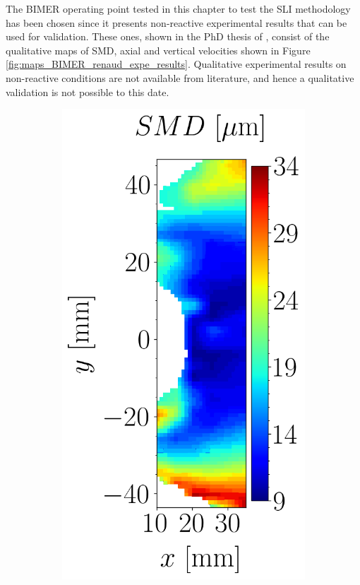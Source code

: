 The BIMER operating point tested in this chapter to test the SLI methodology has been chosen since it presents non-reactive experimental results that can be used for validation. These ones, shown in the PhD thesis of , consist of the qualitative maps of SMD, axial and vertical velocities shown in Figure \ref{fig:maps_BIMER_renaud_expe_results}. Qualitative experimental results on non-reactive conditions are not available from literature, and hence a qualitative validation is not possible to this date.

\begin{figure}[h!]
\flushleft
\begin{subfigure}[b]{0.3\textwidth}
	\centering
   \includegraphics[scale=0.4]{./part3_applications/figures_ch9_lagrangian/expe_maps/SMD_map.png}

\end{subfigure}
\end{figure}
